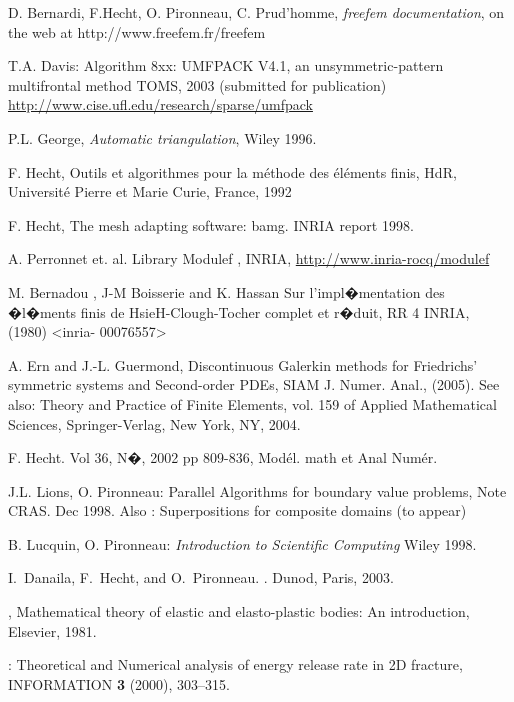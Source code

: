 \documentclass[a4paper,twoside,12pt]{book}
\begin{document}
\begin{thebibliography}{xx}
 {\sc  D. Bernardi, F.Hecht, O. Pironneau, C. Prud'homme}, {\it
freefem documentation}, on the web at  http://www.freefem.fr/freefem


{\sc T.A. Davis}:  {Algorithm 8xx: UMFPACK V4.1, an unsymmetric-pattern multifrontal method}
TOMS,
2003 (submitted for publication)
 \url{ http://www.cise.ufl.edu/research/sparse/umfpack}

{\sc P.L. George},  {\it Automatic triangulation}, Wiley 1996.

 {\sc F. Hecht}, Outils et algorithmes pour la m\'{e}thode des \'{e}l\'{e}ments finis, HdR, Universit\'{e} Pierre et Marie Curie, France, 1992

{\sc F. Hecht}, The mesh adapting software: bamg. INRIA report 1998.


{\sc A. Perronnet et. al. } Library Modulef , INRIA, \url{http://www.inria-rocq/modulef}

{\sc M. Bernadou , J-M Boisserie and K. Hassan } Sur l'impl�mentation des �l�ments finis de 
HsieH-Clough-Tocher complet et r�duit, RR 4  INRIA, (1980)  <inria- 00076557>

 {\sc A. Ern and J.-L. Guermond}, Discontinuous Galerkin methods for Friedrichs' symmetric
systems and Second-order PDEs, SIAM J. Numer. Anal., (2005). See also: Theory and Practice of Finite Elements, vol. 159 of Applied Mathematical Sciences,
Springer-Verlag, New York, NY, 2004.

{\sc F. Hecht.}
\newblock   Vol 36, N�, 2002 pp 809-836,  Mod\'{e}l. math et Anal Num\'{e}r.

{\sc J.L. Lions, O. Pironneau}:
Parallel Algorithms for boundary value problems, Note CRAS. Dec 1998.
Also : Superpositions for composite domains (to appear)

 {\sc B. Lucquin, O. Pironneau}: {\it Introduction to Scientific Computing}
Wiley 1998.

{\sc I.~Danaila, F.~Hecht, and O.~Pironneau}.
.
\newblock Dunod, Paris, 2003.

,
Mathematical theory of elastic and elasto-plastic bodies:
An introduction, Elsevier, 1981.

: Theoretical and Numerical analysis of energy release rate in 2D fracture, INFORMATION \textbf{3} (2000), 303--315.


\end{thebibliography}
\end{document}

